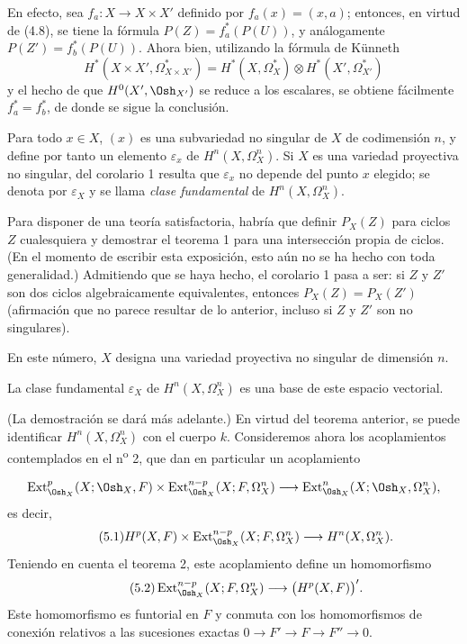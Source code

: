 En efecto, sea $f_a:X\longrightarrow X\times X'$ definido por
$f_a(x)=(x,a)$; entonces, en virtud de (4.8), se tiene la fórmula
$P(Z)=f_a^{*}(P(U))$, y análogamente $P(Z')=f_b^{*}(P(U))$. Ahora bien, utilizando la fórmula de
Künneth
\[
  H^{*}(X\times X',\Omega_{X\times X'}^{*})
  =H^{*}(X,\Omega_X^{*})\otimes H^{*}(X',\Omega_{X'}^{*})
\]
y el hecho de que $H^{0}(X',\Osh_{X'})$ se reduce a los escalares, se obtiene
fácilmente $f_a^{*}=f_b^{*}$, de donde se sigue la conclusión.

Para todo $x\in X$, $(x)$ es una subvariedad no singular de $X$ de
codimensión $n$, y define por tanto un elemento $\varepsilon_x$ de
$H^{n}(X,\Omega_X^{n})$. Si $X$ es una variedad proyectiva no singular, del
corolario 1 resulta que $\varepsilon_x$ no depende del punto $x$ elegido; se
denota por $\varepsilon_X$ y se llama \emph{clase fundamental} de
$H^{n}(X,\Omega_X^{n})$.

 Para disponer de una teoría satisfactoria, habría que definir
$P_X(Z)$ para ciclos $Z$ cualesquiera y demostrar el teorema 1 para una
intersección propia de ciclos. (En el momento de escribir esta exposición, esto aún no se
ha hecho con toda generalidad.) Admitiendo que se haya hecho, el corolario 1
pasa a ser: si $Z$ y $Z'$ son dos ciclos algebraicamente equivalentes, entonces
$P_X(Z)=P_X(Z')$ (afirmación que no parece resultar de lo anterior, incluso si
$Z$ y $Z'$ son no singulares).


En este número, $X$ designa una variedad proyectiva no singular de dimensión
$n$.

 La clase fundamental $\varepsilon_X$ de
$H^{n}(X,\Omega_X^{n})$ es una base de este espacio vectorial.

(La demostración se dará más adelante.) En virtud del teorema anterior, se puede
identificar $H^{n}(X,\Omega_X^{n})$ con el cuerpo $k$. Consideremos ahora los
acoplamientos contemplados en el n\textsuperscript{o} 2, que dan en particular un
acoplamiento

\[
\operatorname{Ext}_{\Osh_X}^{p}(X;\Osh_X,F)
\times\operatorname{Ext}_{\Osh_X}^{n-p}(X;F,\Omega_X^{n})
\longrightarrow
\operatorname{Ext}_{\Osh_X}^{n}(X;\Osh_X,\Omega_X^{n}),
\]
es decir,
\begin{equation}\tag{5.1}
  H^{p}(X,F)
  \times\operatorname{Ext}_{\Osh_X}^{n-p}(X;F,\Omega_X^{n})
  \longrightarrow H^{n}(X,\Omega_X^{n}).
\end{equation}
Teniendo en cuenta el teorema 2, este acoplamiento define un homomorfismo
\begin{equation}\tag{5.2}
  \operatorname{Ext}_{\Osh_X}^{n-p}(X;F,\Omega_X^{n})
  \longrightarrow\bigl(H^{p}(X,F)\bigr)'.
\end{equation}
Este homomorfismo es funtorial en $F$ y conmuta con los homomorfismos de conexión
relativos a las sucesiones exactas $0\longrightarrow F'\longrightarrow F
\longrightarrow F''\longrightarrow0$.

